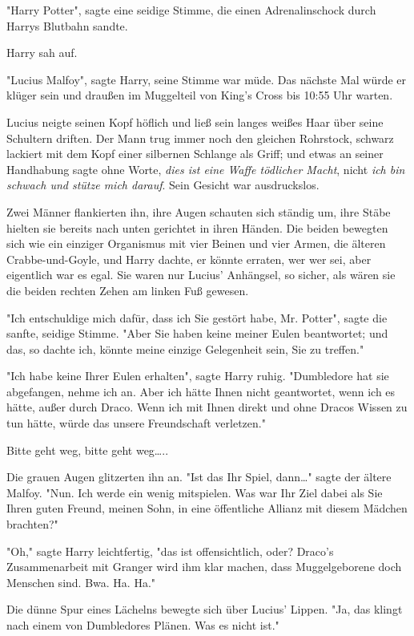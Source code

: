 {"Harry Potter", sagte eine seidige Stimme, die einen Adrenalinschock durch Harrys Blutbahn sandte.

Harry sah auf.

"Lucius Malfoy", sagte Harry, seine Stimme war müde. Das nächste Mal würde er klüger sein und draußen im Muggelteil von King's Cross bis 10:55 Uhr warten.

Lucius neigte seinen Kopf höflich und ließ sein langes weißes Haar über seine Schultern driften. Der Mann trug immer noch den gleichen Rohrstock, schwarz lackiert mit dem Kopf einer silbernen Schlange als Griff; und etwas an seiner Handhabung sagte ohne Worte, \emph{dies ist eine Waffe tödlicher Macht}, nicht \emph{ich bin schwach und stütze mich darauf}. Sein Gesicht war ausdruckslos.

Zwei Männer flankierten ihn, ihre Augen schauten sich ständig um, ihre Stäbe hielten sie bereits nach unten gerichtet in ihren Händen. Die beiden bewegten sich wie ein einziger Organismus mit vier Beinen und vier Armen, die älteren Crabbe-und-Goyle, und Harry dachte, er könnte erraten, wer wer sei, aber eigentlich war es egal. Sie waren nur Lucius' Anhängsel, so sicher, als wären sie die beiden rechten Zehen am linken Fuß gewesen.

"Ich entschuldige mich dafür, dass ich Sie gestört habe, Mr. Potter", sagte die sanfte, seidige Stimme. "Aber Sie haben keine meiner Eulen beantwortet; und das, so dachte ich, könnte meine einzige Gelegenheit sein, Sie zu treffen."

"Ich habe keine Ihrer Eulen erhalten", sagte Harry ruhig. "Dumbledore hat sie abgefangen, nehme ich an. Aber ich hätte Ihnen nicht geantwortet, wenn ich es hätte, außer durch Draco. Wenn ich mit Ihnen direkt und ohne Dracos Wissen zu tun hätte, würde das unsere Freundschaft verletzen."

Bitte geht weg, bitte geht weg…..

Die grauen Augen glitzerten ihn an. "Ist das Ihr Spiel, dann…" sagte der ältere Malfoy. "Nun. Ich werde ein wenig mitspielen. Was war Ihr Ziel dabei als Sie Ihren guten Freund, meinen Sohn, in eine öffentliche Allianz mit diesem Mädchen brachten?"

"Oh," sagte Harry leichtfertig, "das ist offensichtlich, oder? Draco's Zusammenarbeit mit Granger wird ihm klar machen, dass Muggelgeborene doch Menschen sind. Bwa. Ha. Ha."

Die dünne Spur eines Lächelns bewegte sich über Lucius' Lippen. "Ja, das klingt nach einem von Dumbledores Plänen. Was es nicht ist."

}

